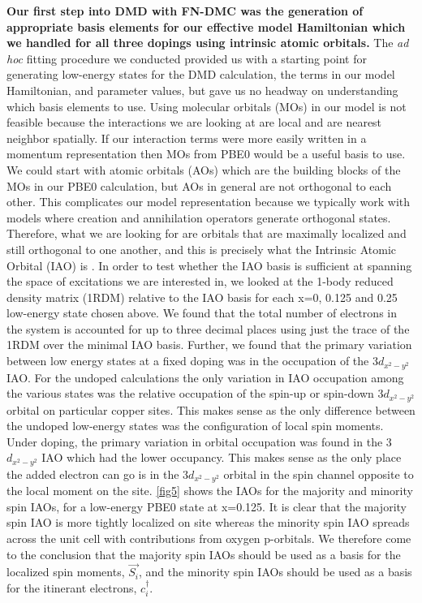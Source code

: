 \documentclass{article}
\begin{document}
\textbf{Our first step into DMD with FN-DMC was the generation of appropriate basis elements for our effective model Hamiltonian which we handled for all three dopings using intrinsic atomic orbitals. }
The \textit{ad hoc} fitting procedure we conducted provided us with a starting point for generating low-energy states for the DMD calculation, the terms in our model Hamiltonian, and parameter values, but gave us no headway on understanding which basis elements to use.
Using molecular orbitals (MOs) in our model is not feasible because the interactions we are looking at are local and are nearest neighbor spatially. 
If our interaction terms were more easily written in a momentum representation then MOs from PBE0 would be a useful basis to use. 
We could start with atomic orbitals (AOs) which are the building blocks of the MOs in our PBE0 calculation, but AOs in general are not orthogonal to each other. 
This complicates our model representation because we typically work with models where creation and annihilation operators generate orthogonal states. 
Therefore, what we are looking for are orbitals that are maximally localized and still orthogonal to one another, and this is precisely what the Intrinsic Atomic Orbital (IAO) is \cite{doi:10.1021/ct400687b}. 
In order to test whether the IAO basis is sufficient at spanning the space of excitations we are interested in, we looked at the 1-body reduced density matrix (1RDM) relative to the IAO basis for each x=0, 0.125 and 0.25 low-energy state chosen above. 
We found that the total number of electrons in the system is accounted for up to three decimal places using just the trace of the 1RDM over the minimal IAO basis. 
Further, we found that the primary variation between low energy states at a fixed doping was in the occupation of the 3$d_{x^2-y^2}$ IAO. 
For the undoped calculations the only variation in IAO occupation among the various states was the relative occupation of the spin-up or spin-down 3$d_{x^2-y^2}$ orbital on particular copper sites. 
This makes sense as the only difference between the undoped low-energy states was the configuration of local spin moments. 
Under doping, the primary variation in orbital occupation was found in the 3$d_{x^2-y^2}$ IAO which had the lower occupancy.
This makes sense as the only place the added electron can go is in the 3$d_{x^2-y^2}$ orbital in the spin channel opposite to the local moment on the site. 
\ref{fig5} shows the IAOs for the majority and minority spin IAOs, for a low-energy PBE0 state at x=0.125. 
It is clear that the majority spin IAO is more tightly localized on site whereas the minority spin IAO spreads across the unit cell with contributions from oxygen p-orbitals. 
We therefore come to the conclusion that the majority spin IAOs should be used as a basis for the localized spin moments, $\vec{S_i}$, and the minority spin IAOs should be used as a basis for the itinerant electrons, $c_i^\dagger$. 
\end{document}
